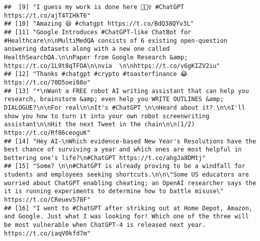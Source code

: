 \documentclass[
]{article}
\begin{document}
\begin{verbatim}
##  [9] "I guess my work is done here 🤷🏻‍♀️ #ChatGPT https://t.co/ajT4TIHkT6"                                                                                                                                                                                                                                                                  
## [10] "Amazing 😆 #chatgpt https://t.co/BdQ38QYv3L"                                                                                                                                                                                                                                                                                          
## [11] "Google Introduces #ChatGPT-like ChatBot for #Healthcare\n\nMultiMedQA consists of 6 existing open-question answering datasets along with a new one called HealthSearchQA.\n\nPaper from Google Research &amp;  https://t.co/1L9t8qTFOA\n\nvia  \n\nhttps://t.co/v6gKIZV2iu"                                                           
## [12] "Thanks #chatgpt #crypto #toasterfinance 😂 https://t.co/70D5oei68o"                                                                                                                                                                                                                                                                   
## [13] "*\nWant a FREE robot AI writing assistant that can help you research, brainstorm &amp; even help you WRITE OUTLINES &amp; DIALOGUE?\n\nFor real\n\nIt's #ChatGPT \n\nHeard about it? \n\nI'll show you how to turn it into your own robot screenwriting assistant\n\nHit the next Tweet in the chain\n\n(1/2) https://t.co/Rf86ceoguK"
## [14] "Hey AI-\nWhich evidence-based New Year's Resolutions have the best chance of surviving a year and which ones are most helpful in bettering one's life?\n#ChatGPT https://t.co/ahgJa8DMtj"                                                                                                                                             
## [15] "Some? \n\n#ChatGPT is already proving to be a windfall for students and employees seeking shortcuts.\n\n\"Some US educators are worried about ChatGPT enabling cheating; an OpenAI researcher says the it is running experiments to determine how to battle misuse\" https://t.co/CReuev578F"                                         
## [16] "I went to #ChatGPT after striking out at Home Depot, Amazon, and Google. Just what I was looking for! Which one of the three will be most vulnerable when ChatGPT-4 is released next year. https://t.co/iaqV0kfd7m"                                                                                                                   

\end{verbatim}
\end{document}
